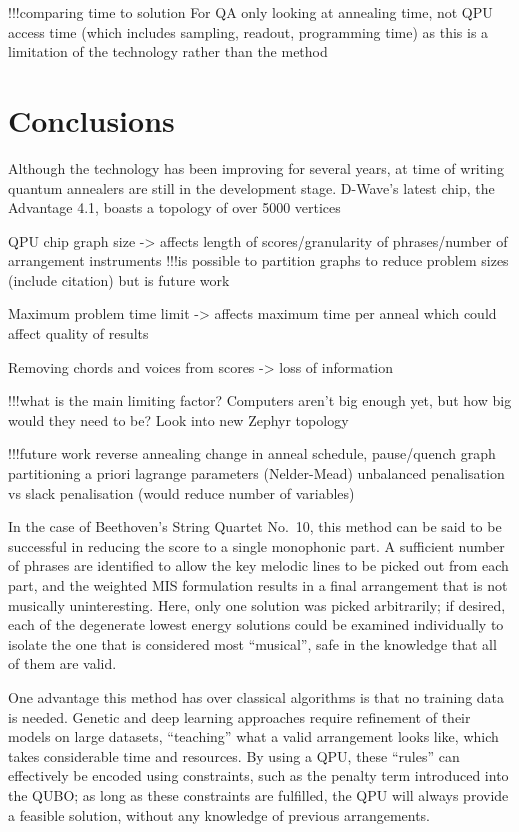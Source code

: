 \documentclass[12pt]{article}
\theoremstyle{definition}
\begin{document}
!!!comparing time to solution
For QA only looking at annealing time, not QPU access time (which includes sampling, readout, programming time) as this is a limitation of the technology rather than the method

\section{Conclusions}


Although the technology has been improving for several years, at time of writing quantum annealers are still in the development stage. D-Wave's latest chip, the Advantage 4.1, boasts a topology of over \num{5000} vertices

QPU chip graph size -> affects length of scores/granularity of phrases/number of arrangement instruments
!!!is possible to partition graphs to reduce problem sizes (include citation) but is future work

Maximum problem time limit -> affects maximum time per anneal which could affect quality of results

Removing chords and voices from scores -> loss of information

!!!what is the main limiting factor?
Computers aren't big enough yet, but how big would they need to be? Look into new Zephyr topology

!!!future work
reverse annealing
change in anneal schedule, pause/quench
graph partitioning
a priori lagrange parameters (Nelder-Mead)
unbalanced penalisation vs slack penalisation (would reduce number of variables)


In the case of Beethoven's String Quartet No.\ 10, this method can be said to be successful in reducing the score to a single monophonic part. A sufficient number of phrases are identified to allow the key melodic lines to be picked out from each part, and the weighted MIS formulation results in a final arrangement that is not musically uninteresting. Here, only one solution was picked arbitrarily; if desired, each of the degenerate lowest energy solutions could be examined individually to isolate the one that is considered most ``musical'', safe in the knowledge that all of them are valid.

One advantage this method has over classical algorithms is that no training data is needed. Genetic and deep learning approaches require refinement of their models on large datasets, ``teaching'' what a valid arrangement looks like, which takes considerable time and resources. By using a QPU, these ``rules'' can effectively be encoded using constraints, such as the penalty term introduced into the QUBO; as long as these constraints are fulfilled, the QPU will always provide a feasible solution, without any knowledge of previous arrangements.
\end{document}
